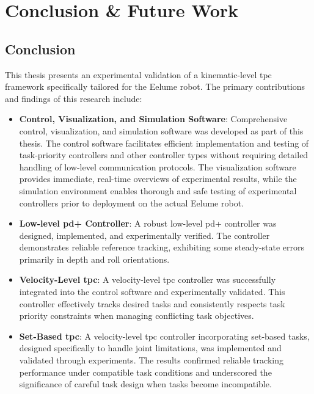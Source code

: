 \chapter{Conclusion \& Future Work}
\label{ch:conclusion}

\section{Conclusion}

This thesis presents an experimental validation of a kinematic-level \gls{tpc} framework specifically tailored for the Eelume robot. The primary contributions and findings of this research include:
\begin{itemize}
\item \textbf{Control, Visualization, and Simulation Software}: Comprehensive control, visualization, and simulation software was developed as part of this thesis. The control software facilitates efficient implementation and testing of task-priority controllers and other controller types without requiring detailed handling of low-level communication protocols. The visualization software provides immediate, real-time overviews of experimental results, while the simulation environment enables thorough and safe testing of experimental controllers prior to deployment on the actual Eelume robot.

\item \textbf{Low-level \gls{pd+} Controller}: A robust low-level \gls{pd+} controller was designed, implemented, and experimentally verified. The controller demonstrates reliable reference tracking, exhibiting some steady-state errors primarily in depth and roll orientations.

\item \textbf{Velocity-Level \gls{tpc}}: A velocity-level \gls{tpc} controller was successfully integrated into the control software and experimentally validated. This controller effectively tracks desired tasks and consistently respects task priority constraints when managing conflicting task objectives.

\item \textbf{Set-Based \gls{tpc}}: A velocity-level \gls{tpc} controller incorporating set-based tasks, designed specifically to handle joint limitations, was implemented and validated through experiments. The results confirmed reliable tracking performance under compatible task conditions and underscored the significance of careful task design when tasks become incompatible.
\end{itemize}

